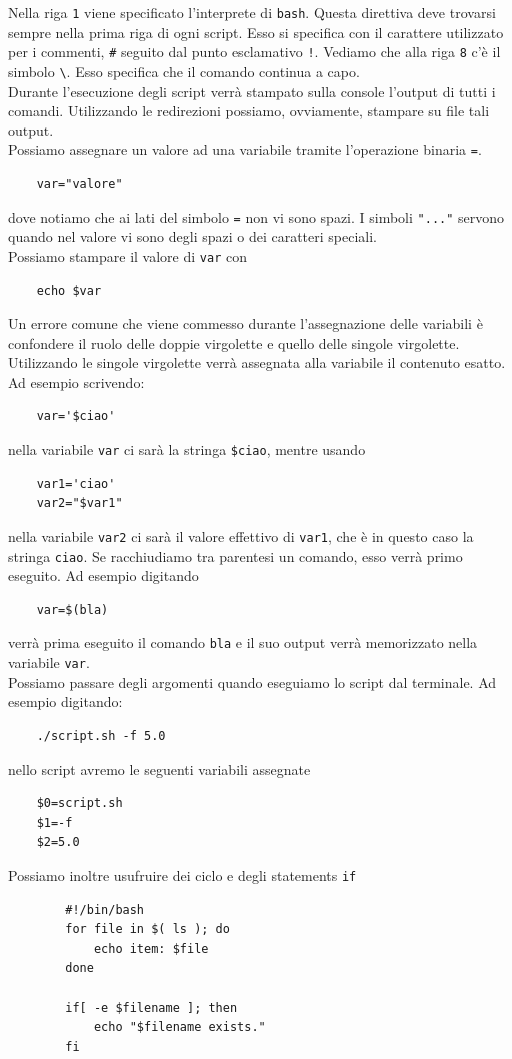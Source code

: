Nella riga \verb*|1| viene specificato l'interprete di \verb*|bash|. Questa direttiva deve trovarsi sempre nella prima riga di ogni script. Esso si specifica con il carattere utilizzato per i commenti, \verb*|#| seguito dal punto esclamativo \verb*|!|. Vediamo che alla riga \verb*|8| c'è il simbolo \verb*|\|. Esso specifica che il comando continua a capo. \\
Durante l'esecuzione degli script verrà stampato sulla console l'output di tutti i comandi. Utilizzando le redirezioni possiamo, ovviamente, stampare su file tali output. \\
Possiamo assegnare un valore ad una variabile tramite l'operazione binaria \verb*|=|. 
\begin{verbatim}
	var="valore"
\end{verbatim}
dove notiamo che ai lati del simbolo \verb*|=| non vi sono spazi. I simboli \verb*|"..."| servono quando nel valore vi sono degli spazi o dei caratteri speciali. \\
Possiamo stampare il valore di \verb*|var| con
\begin{verbatim}
	echo $var
\end{verbatim}	
Un errore comune che viene commesso durante l'assegnazione delle variabili è confondere il ruolo delle doppie virgolette e quello delle singole virgolette.\\
Utilizzando le singole virgolette verrà assegnata alla variabile il contenuto esatto. Ad esempio scrivendo:
\begin{verbatim}
	var='$ciao'
\end{verbatim}
nella variabile \verb*|var| ci sarà la stringa \verb*|$ciao|, mentre usando
\begin{verbatim}
	var1='ciao'
	var2="$var1"
\end{verbatim}
nella variabile \verb*|var2| ci sarà il valore effettivo di \verb*|var1|, che è in questo caso la stringa \verb*|ciao|. Se racchiudiamo tra parentesi un comando, esso verrà primo eseguito. Ad esempio digitando
\begin{verbatim}
	var=$(bla)
\end{verbatim}
verrà prima eseguito il comando \verb*|bla| e il suo output verrà memorizzato nella variabile \verb*|var|.\\
Possiamo passare degli argomenti quando eseguiamo lo script dal terminale. Ad esempio digitando:
\begin{verbatim}
	./script.sh -f 5.0
\end{verbatim}
nello script avremo le seguenti variabili assegnate
\begin{verbatim}
	$0=script.sh
	$1=-f
	$2=5.0
\end{verbatim}
Possiamo inoltre usufruire dei ciclo e degli statements \verb*|if|
\begin{esempio}
	\begin{verbatim}
		#!/bin/bash
		for file in $( ls ); do
			echo item: $file
		done
		
		if[ -e $filename ]; then
			echo "$filename exists."
		fi
	\end{verbatim}
\end{esempio}



